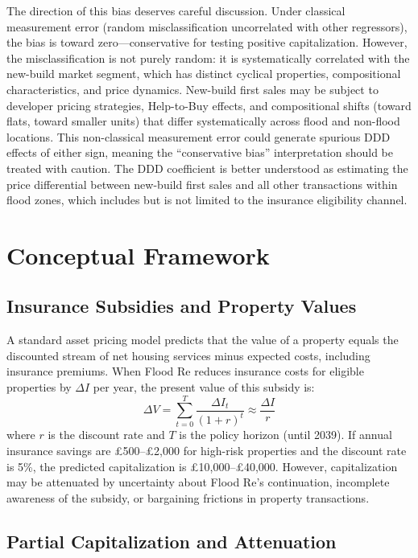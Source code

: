 \documentclass[12pt]{article}
\begin{document}
The direction of this bias deserves careful discussion. Under classical measurement error (random misclassification uncorrelated with other regressors), the bias is toward zero---conservative for testing positive capitalization. However, the misclassification is not purely random: it is systematically correlated with the new-build market segment, which has distinct cyclical properties, compositional characteristics, and price dynamics. New-build first sales may be subject to developer pricing strategies, Help-to-Buy effects, and compositional shifts (toward flats, toward smaller units) that differ systematically across flood and non-flood locations. This non-classical measurement error could generate spurious DDD effects of either sign, meaning the ``conservative bias'' interpretation should be treated with caution. The DDD coefficient is better understood as estimating the price differential between new-build first sales and all other transactions within flood zones, which includes but is not limited to the insurance eligibility channel.


\section{Conceptual Framework}
\label{sec:framework}

\subsection{Insurance Subsidies and Property Values}

A standard asset pricing model predicts that the value of a property equals the discounted stream of net housing services minus expected costs, including insurance premiums. When Flood Re reduces insurance costs for eligible properties by $\Delta I$ per year, the present value of this subsidy is:
\begin{equation}
\Delta V = \sum_{t=0}^{T} \frac{\Delta I_t}{(1+r)^t} \approx \frac{\Delta I}{r}
\label{eq:capitalization}
\end{equation}
where $r$ is the discount rate and $T$ is the policy horizon (until 2039). If annual insurance savings are \pounds500--\pounds2,000 for high-risk properties and the discount rate is 5\%, the predicted capitalization is \pounds10,000--\pounds40,000. However, capitalization may be attenuated by uncertainty about Flood Re's continuation, incomplete awareness of the subsidy, or bargaining frictions in property transactions.

\subsection{Partial Capitalization and Attenuation}
\end{document}
